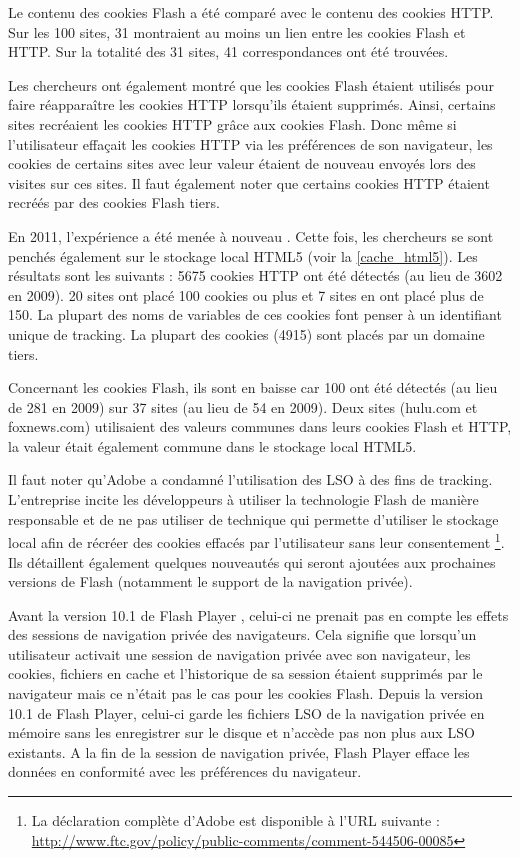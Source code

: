 Le contenu des cookies Flash a été comparé avec le contenu des cookies HTTP. Sur les 100 sites, 31 montraient au moins un lien entre les cookies Flash et HTTP. Sur la totalité des 31 sites, 41 correspondances ont été trouvées.

Les chercheurs ont également montré que les cookies Flash étaient utilisés pour faire réapparaître les cookies HTTP lorsqu'ils étaient supprimés. Ainsi, certains sites recréaient les cookies HTTP grâce aux cookies Flash. Donc même si l'utilisateur effaçait les cookies HTTP via les préférences de son navigateur, les cookies de certains sites avec leur valeur étaient de nouveau envoyés lors des visites sur ces sites. Il faut également noter que certains cookies HTTP étaient recréés par des cookies Flash tiers.
\newline

En 2011, l'expérience a été menée à nouveau \cite{flash_cookies_privacy_2}. Cette fois, les chercheurs se sont penchés également sur le stockage local HTML5 (voir la \autoref{cache_html5}). Les résultats sont les suivants : 5675 cookies HTTP ont été détectés (au lieu de 3602 en 2009). 20 sites ont placé 100 cookies ou plus et 7 sites en ont placé plus de 150. La plupart des noms de variables de ces cookies font penser à un identifiant unique de tracking. La plupart des cookies (4915) sont placés par un domaine tiers.

Concernant les cookies Flash, ils sont en baisse car 100 ont été détectés (au lieu de 281 en 2009) sur 37 sites (au lieu de 54 en 2009).
Deux sites (hulu.com et foxnews.com) utilisaient des valeurs communes dans leurs cookies Flash et HTTP, la valeur était également commune dans le stockage local HTML5.
\newline

Il faut noter qu'Adobe a condamné l'utilisation des LSO à des fins de tracking. L'entreprise incite les développeurs à utiliser la technologie Flash de manière responsable et de ne pas utiliser de technique qui permette d'utiliser le stockage local afin de récréer des cookies effacés par l'utilisateur sans leur consentement \footnote{La déclaration complète d'Adobe est disponible à l'URL suivante : \url{http://www.ftc.gov/policy/public-comments/comment-544506-00085}}. Ils détaillent également quelques nouveautés qui seront ajoutées aux prochaines versions de Flash (notamment le support de la navigation privée).
\newline

Avant la version 10.1 de Flash Player \cite{flash_private}, celui-ci ne prenait pas en compte les effets des sessions de navigation privée des navigateurs. Cela signifie que lorsqu'un utilisateur activait une session de navigation privée avec son navigateur, les cookies, fichiers en cache et l'historique de sa session étaient supprimés par le navigateur mais ce n'était pas le cas pour les cookies Flash. Depuis la version 10.1 de Flash Player, celui-ci garde les fichiers LSO de la navigation privée en mémoire sans les enregistrer sur le disque et n'accède pas non plus aux LSO existants. A la fin de la session de navigation privée, Flash Player efface les données en conformité avec les préférences du navigateur.


